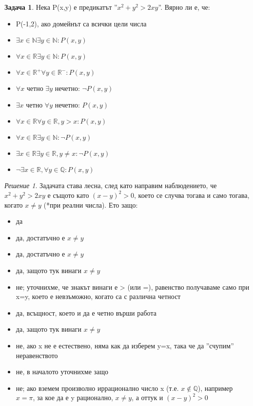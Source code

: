 \documentclass[10pt, a4paper]{article}
\theoremstyle{definition}
\newtheorem{problem}{Задача}
\theoremstyle{remark}
\newtheorem*{sol}{Решение}
\begin{document}
\begin{problem}
    Нека P(x,y) е предикатът ''\(x^2+y^2>2xy\)''. Вярно ли е, че:
    \begin{itemize}
        \item P(-1,2), ако домейнът са всички цели числа
        \item \(\exists x \in \mathbb{N} \exists y \in \mathbb{N}:P(x,y)\)
        \item \(\forall x \in \mathbb{R} \exists y \in \mathbb{N}:P(x,y)\)
        \item \(\forall x \in \mathbb{R^+} \forall y \in \mathbb{R^-}:P(x,y)\)
        \item \(\forall x\) четно \(\exists y\) нечетно: \(\neg P(x,y)\)
        \item \(\exists x\) четно \(\forall y\) нечетно: \(P(x,y)\)
        \item \(\forall x \in \mathbb{R} \forall y \in \mathbb{R}, y>x: P(x,y)\)
        \item \(\forall x \in \mathbb{R} \exists y \in \mathbb{N}:\neg P(x,y)\)
        \item \(\exists x \in \mathbb{R} \exists y \in \mathbb{R}, y\neq x:\neg P(x,y)\)
        \item \(\neg\exists x \in \mathbb{R}, \forall y \in \mathbb{Q}:P(x,y)\)
    \end{itemize}
\end{problem}
\begin{sol}
    Задачата става лесна, след като направим наблюдението, че \(x^2+y^2>2xy\) е същото като \((x-y)^2>0\), което се случва тогава и само тогава, когато \(x\neq y\) (*при реални числа). Ето защо:
    \begin{itemize}
        \item да
        \item да, достатъчно е \(x\neq y\)
        \item да, достатъчно е \(x\neq y\)
        \item да, защото тук винаги \(x\neq y\)
        \item не; уточнихме, че знакът винаги е > (или =), равенство получаваме само при x=y, което е невзъможно, когато са с различна четност
        \item да, всъщност, което и да е четно върши работа
        \item да, защото тук винаги \(x\neq y\)
        \item не, ако x не е естествено, няма как да изберем y=x, така че да ''счупим'' неравенството
        \item не, в началото уточнихме защо
        \item не; ако вземем произволно иррационално число x (т.е. \(x \notin \mathbb{Q}\)), например \(x=\pi\), за кое да е y рационално, \(x\neq y\), а оттук и \((x-y)^2>0\)
        
    \end{itemize}
    
\end{sol}
\end{document}
